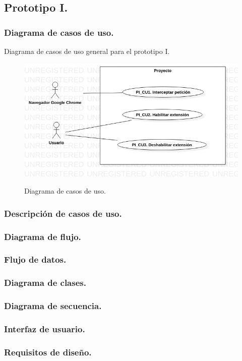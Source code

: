 \documentclass[12pt, a4paper, titlepage]{article}
\begin{document}
		\subsection{Prototipo I.}
			\subsubsection{Diagrama de casos de uso.}
			Diagrama de casos de uso general para el prototipo I.
			\begin{figure}[htb]
				\begin{center}
					\label{fig1} 
					\includegraphics[width=17cm]{./imagenes/UCD_1.jpg}
					\caption{Diagrama de casos de uso.}
				\end{center}
			\end{figure}
			\subsubsection{Descripción de casos de uso.}
			\subsubsection{Diagrama de flujo.}
			\subsubsection{Flujo de datos.}
			\subsubsection{Diagrama de clases.}
			\subsubsection{Diagrama de secuencia.}
			\subsubsection{Interfaz de usuario.}
			\subsubsection{Requisitos de diseño.}
			
\end{document}
